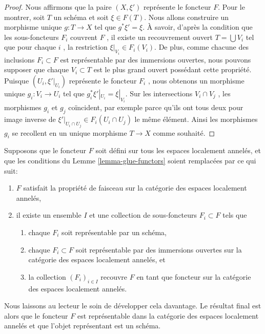 \begin{proof}
\medskip\noindent
Nous affirmons que la paire  $(X, \xi')$  représente le foncteur  $F$. Pour
le montrer, soit  $T$  un schéma et soit  $\xi \in F(T)$. Nous allons
construire un morphisme unique  $g : T \to X$  tel que  $g^*\xi' = \xi$. À savoir,
d’après la condition que les sous-foncteurs  $F_i$  couvrent  $F$ , il
existe un recouvrement ouvert  $T = \bigcup V_i$  tel que pour chaque  $i$ , la
restriction  $\xi|_{V_i} \in F_i(V_i)$. De plus, comme chacune des inclusions  $F_i \subset F$  est
représentable par des immersions ouvertes, nous pouvons supposer que chaque
 $V_i \subset T$  est le plus grand ouvert possédant cette propriété. Puisque
 $(U_i, \xi'|_{U_i})$  représente le foncteur  $F_i$ , nous obtenons un morphisme
unique  $g_i : V_i \to U_i$  tel que  $g_i^*\xi'|_{U_i} = \xi|_{V_i}$. Sur les intersections  $V_i \cap V_j$ , les
morphismes  $g_i$  et  $g_j$  coïncident, par exemple parce qu'ils
ont tous deux pour image inverse de  $\xi'|_{U_i \cap U_j} \in F_i(U_i \cap U_j)$  le même élément. Ainsi les morphismes
 $g_i$  se recollent en un unique morphisme  $T \to X$  comme
souhaité.
\end{proof}

\begin{remark}
\label{remark-representable-locally-ringed}
Supposons que le foncteur  $F$  soit défini sur tous les espaces localement
annelés, et que les conditions du Lemme  \ref{lemma-glue-functors}  soient remplacées par ce qui
suit:
\begin{enumerate}
\item $F$  satisfait la propriété de faisceau sur la catégorie des espaces
localement annelés,
\item il existe un ensemble  $I$  et une collection de sous-foncteurs
 $F_i \subset F$  tels que
\begin{enumerate}
\item chaque  $F_i$  soit représentable par un schéma,
\item chaque  $F_i \subset F$  soit représentable par des immersions ouvertes sur la
catégorie des espaces localement annelés, et
\item la collection  $(F_i)_{i \in I}$  recouvre  $F$  en tant que foncteur sur la
catégorie des espaces localement annelés.
\end{enumerate}
\end{enumerate}
Nous laissons au lecteur le soin de développer cela davantage. Le résultat final
est alors que le foncteur  $F$  est représentable dans la catégorie des
espaces localement annelés et que l'objet représentant est un schéma.
\end{remark}



